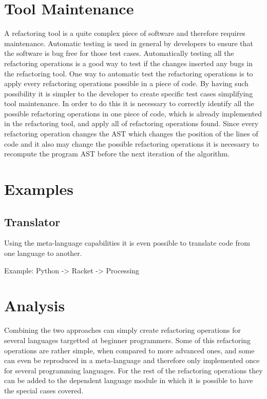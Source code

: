 \section{Tool Maintenance} %
A refactoring tool is a quite complex piece of software and therefore requires maintenance.
Automatic testing is used in general by developers to ensure that the software
is bug free for those test cases.
Automatically testing all the refactoring operations is a good way to test if
the changes inserted any bugs in the refactoring tool.
One way to automatic test the refactoring operations is to apply every refactoring
operations possible in a piece of code. By having such possibility it is simpler
to the developer to create specific test cases simplifying tool maintenance.
In order to do this it is necessary to correctly identify all the possible refactoring
operations in one piece of code, which is already implemented in the refactoring
tool, and apply all of refactoring operations found.
Since every refactoring operation changes the AST which changes the position of the
lines of code and it also may change the possible refactoring operations it is necesasry to recompute the
program AST before the next iteration of the algorithm.


\section{Examples}  %

\subsection{Translator}
Using the meta-language capabilities it is even possible to translate code
from one language to another.

Example: Python -> Racket -> Processing
\section{Analysis} %
Combining the two approaches can simply create refactoring operations for several
languages targetted at beginner programmers. Some of this refactoring operations
are rather simple, when compared to more advanced ones, and some can even be reproduced
in a meta-language and therefore only implemented once for several programming languages.
For the rest of the refactoring operations they can be added to the dependent language
module in which it is possible to have the special cases covered.

